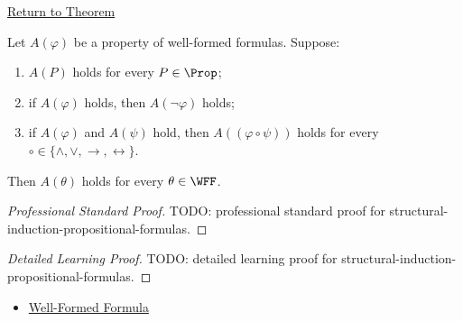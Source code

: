 \newpage
{}
\label{prf:structural-induction-propositional-formulas}

\begin{remark*}[Return]
\hyperref[thm:structural-induction-propositional-formulas]{Return to Theorem}
\end{remark*}

\begin{theorem*}
Let \(A(\varphi)\) be a property of well-formed formulas. Suppose:
\begin{enumerate}
\item \(A(P)\) holds for every \(P\in\Prop\);
\item if \(A(\varphi)\) holds, then \(A(\neg\varphi)\) holds;
\item if \(A(\varphi)\) and \(A(\psi)\) hold, then \(A((\varphi\circ\psi))\) holds for every \(\circ\in\{\land,\lor,\to,\leftrightarrow\}\).
\end{enumerate}
Then \(A(\theta)\) holds for every \(\theta\in\WFF\).
\end{theorem*}

\begin{proof}[Professional Standard Proof]
\LRAProofBodyStart
TODO: professional standard proof for structural-induction-propositional-formulas.
\end{proof}

\begin{proof}[Detailed Learning Proof]
\LRAProofBodyStart
TODO: detailed learning proof for structural-induction-propositional-formulas.
\end{proof}

\begin{remark*}
\end{remark*}

\begin{dependencies}
\begin{itemize}
  \item \hyperref[def:well-formed-formula]{Well-Formed Formula}
\end{itemize}
\end{dependencies}

\clearpage
